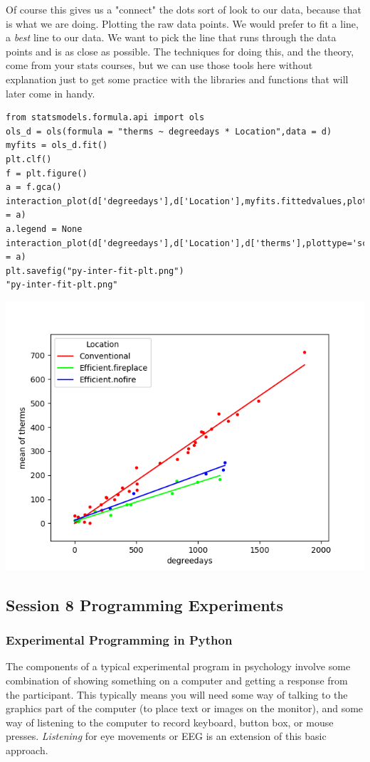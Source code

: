\documentclass{article}
\begin{document}
\begin{enumerate}
Of course this gives us a "connect" the dots sort of look to our data, because that is what we are doing. Plotting the raw data points. We would prefer to fit a line, a \emph{best} line to our data. We want to pick the line that runs through the data points and is as close as possible. The techniques for doing this, and the theory, come from your stats courses, but we can use those tools here without explanation just to get some practice with the libraries and functions that will later come in handy. 

\begin{verbatim}
from statsmodels.formula.api import ols
ols_d = ols(formula = "therms ~ degreedays * Location",data = d)
myfits = ols_d.fit()
plt.clf()
f = plt.figure()
a = f.gca()
interaction_plot(d['degreedays'],d['Location'],myfits.fittedvalues,plottype="line",ax = a)
a.legend = None
interaction_plot(d['degreedays'],d['Location'],d['therms'],plottype='scatter',ax = a)
plt.savefig("py-inter-fit-plt.png")
"py-inter-fit-plt.png"
\end{verbatim}

\begin{center}
\includegraphics[width=.9\linewidth]{py-inter-fit-plt.png}
\end{center}
\end{enumerate}
\subsection{Session 8 Programming Experiments}
\label{sec:org00ec778}
\subsubsection{Experimental Programming in Python}
\label{sec:orgf81b6de}
The components of a typical experimental program in psychology involve some combination of showing something on a computer and getting a response from the participant. This typically means you will need some way of talking to the graphics part of the computer (to place text or images on the monitor), and some way of listening to the computer to record keyboard, button box, or mouse presses. \emph{Listening} for eye movements or EEG is an extension of this basic approach. 
\end{document}
